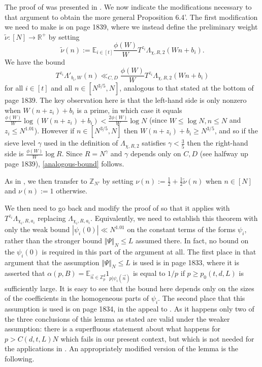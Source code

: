 \documentclass[11pt]{amsart}
\numberwithin{equation}{section}  %
\theoremstyle{remark}
\theoremstyle{plain}
\numberwithin{equation}{section}
\newcommand{\Z}{\mathbb{Z}}
\newcommand{\R}{\mathbb{R}}
\newcommand{\E}{\mathbb{E}}  %
\renewcommand{\le}{\leqslant}
\renewcommand{\leq}{\leqslant}
\renewcommand{\geq}{\geqslant}
\renewcommand{\(}{\left(}
\renewcommand{\)}{\right)}
\newcommand{\vect}[1]{{\ensuremath{\vec{#1}}}}
\begin{document}
The proof of \cite[Proposition 6.4]{gt-linearprimes} was presented in \cite[Appendix D]{gt-linearprimes}. We now indicate the modifications necessary to that argument to obtain the more general Proposition 6.4'. The first modification we need to make is on page 1839, where we instead define the preliminary weight $\tilde\nu : [N] \rightarrow \R^+$ by setting
\[ \tilde\nu(n) := \E_{i \in [t]} \frac{\phi(W)}{W} T^{z_i}\Lambda_{\chi,R,2}(Wn + b_i).\] 
We have the bound
\begin{equation}\label{analogous-bound} T^{z_i}\Lambda'_{b_i,W}(n)
  \ll_{C,D} \frac{\phi(W)}{W} T^{z_i}\Lambda_{\chi, R, 2}(Wn +
  b_i)\end{equation} for all $i \in [t]$ and all $n \in [N^{3/5}, N]$,
analogous to that stated at the bottom of page 1839. The key
observation here is that the left-hand side is only nonzero when $W(n
+ z_i) + b_i$ is a prime, in which case it equals
$\frac{\phi(W)}{W}\log(W (n + z_i) + b_i) < \frac{2\phi(W)}{W} \log N$
(since $W \le \log N, n \leq N$ and $z_i \leq N^{1.01}$). However if $n \in [N^{3/5}, N]$ then $W(n + z_i) + b_i \geq N^{3/5}$, and so if the sieve level $\gamma$ used in the definition of $\Lambda_{\chi, R,2}$ satisfies $\gamma < \frac{3}{5}$ then the right-hand side is $\frac{\phi(W)}{W} \log R$. Since $R = N^{\gamma}$ and $\gamma$ depends only on $C,D$ (see halfway up page 1839), \eqref{analogous-bound} follows.


As in \cite[Appendix D]{gt-linearprimes}, we then transfer to $\Z_{N'}$ by setting $\nu(n) := \frac{1}{2} + \frac{1}{2} \tilde\nu(n)$ when $n \in [N]$ and $\nu(n) := 1$ otherwise. 

We then need to go back and modify the proof of \cite[Theorem D.3]{gt-linearprimes} so that it applies with $T^{z_i}\Lambda_{\chi_i, R, a_i}$ replacing $\Lambda_{\chi_i, R, a_i}$. Equivalently, we need to establish this theorem with only the weak bound $|\psi_i(0)| \ll N^{1.01}$ on the constant terms of the forms $\psi_i$, rather than the stronger bound $\Vert \Psi \Vert_N \leq L$ assumed there.  In fact, no bound on the $\psi_i(0)$ is required in this part of the argument at all. The first place in that argument that the assumption $\Vert \Psi \Vert_N \leq L$ is used is in page 1833, where it is asserted that $\alpha(p,B) = \E_{\vect{n} \in \Z_p^d} 1_{p | \psi_i(\vect{n})} $ is equal to $1/p$ if $p \geq p_0(t,d,L)$ is sufficiently large. It is easy to see that the bound here depends only on the sizes of the coefficients in the homogeneous parts of $\psi_i$. The second place that this assumption is used is on page 1834, in the appeal to \cite[Lemma 1.3]{gt-linearprimes}. As it happens only two of the three conclusions of this lemma as stated are valid under the weaker assumption: there is a superfluous statement about what happens for $p > C(d,t,L) N$ which fails in our present context, but which is not needed for the applications in \cite[Appendix D]{gt-linearprimes}. An appropriately modified version of the lemma is the following.
\end{document}
